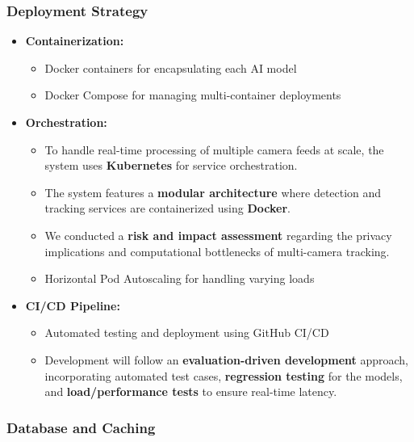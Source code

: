 \subsubsection{Deployment Strategy}
\label{subsubsection:deployment-strategy}

\begin{itemize}
    \item \textbf{Containerization:} 
    \begin{itemize}
        \item Docker containers for encapsulating each AI model
        \item Docker Compose for managing multi-container deployments
    \end{itemize}
    \item \textbf{Orchestration:} 
    \begin{itemize}
        \item To handle real-time processing of multiple camera feeds at scale, the system uses \textbf{Kubernetes} for service orchestration.
        \item The system features a \textbf{modular architecture} where detection and tracking services are containerized using \textbf{Docker}.
        \item We conducted a \textbf{risk and impact assessment} regarding the privacy implications and computational bottlenecks of multi-camera tracking.
        \item Horizontal Pod Autoscaling for handling varying loads
    \end{itemize}
    \item \textbf{CI/CD Pipeline:} 
    \begin{itemize}
        \item Automated testing and deployment using GitHub CI/CD
        \item Development will follow an \textbf{evaluation-driven development} approach, incorporating automated test cases, \textbf{regression testing} for the models, and \textbf{load/performance tests} to ensure real-time latency.
    \end{itemize}
\end{itemize}

\subsubsection{Database and Caching}
\label{subsubsection:database-caching}

